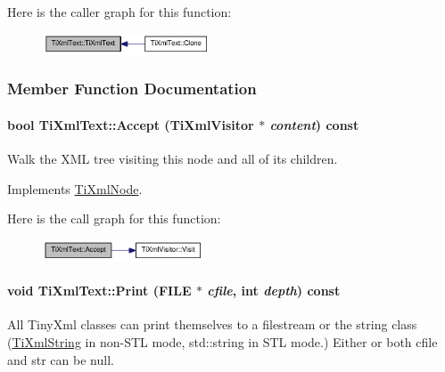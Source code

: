 Here is the caller graph for this function:\nopagebreak
\begin{figure}[H]
\begin{center}
\leavevmode
\includegraphics[width=140pt]{class_ti_xml_text_af659e77c6b87d684827f35a8f4895960_icgraph}
\end{center}
\end{figure}


\subsubsection{Member Function Documentation}
\hypertarget{class_ti_xml_text_a43b9954ebf679557fac1a4453f337b7c}{
\paragraph[{Accept}]{\setlength{\rightskip}{0pt plus 5cm}bool TiXmlText::Accept ({\bf TiXmlVisitor} $\ast$ {\em content}) const}\hfill}
\label{class_ti_xml_text_a43b9954ebf679557fac1a4453f337b7c}
Walk the XML tree visiting this node and all of its children. 

Implements \hyperlink{class_ti_xml_node_acc0f88b7462c6cb73809d410a4f5bb86}{TiXmlNode}.

Here is the call graph for this function:\nopagebreak
\begin{figure}[H]
\begin{center}
\leavevmode
\includegraphics[width=135pt]{class_ti_xml_text_a43b9954ebf679557fac1a4453f337b7c_cgraph}
\end{center}
\end{figure}
\hypertarget{class_ti_xml_text_ae74d56c5b3ddec6cc3103dd51821af92}{
\paragraph[{Print}]{\setlength{\rightskip}{0pt plus 5cm}void TiXmlText::Print (FILE $\ast$ {\em cfile}, \/  int {\em depth}) const}\hfill}
\label{class_ti_xml_text_ae74d56c5b3ddec6cc3103dd51821af92}
All TinyXml classes can print themselves to a filestream or the string class (\hyperlink{class_ti_xml_string}{TiXmlString} in non-\/STL mode, std::string in STL mode.) Either or both cfile and str can be null.

